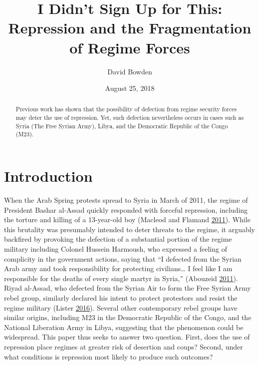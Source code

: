 \documentclass[12pt,]{article}
\title{I Didn't Sign Up for This: Repression and the Fragmentation of Regime
Forces}
\author{David Bowden}
\date{August 25, 2018}
\theoremstyle{definition}
\theoremstyle{definition}
\theoremstyle{definition}
\theoremstyle{remark}
\begin{document}
\maketitle
\begin{abstract}
Previous work has shown that the possibility of defection from regime
security forces may deter the use of repression. Yet, such defection
nevertheless occurs in cases such as Syria (The Free Syrian Army),
Libya, and the Democratic Republic of the Congo (M23).
\end{abstract}

\doublespacing

\setlength{\parindent}{1cm}

\hypertarget{introduction}{%
\section{Introduction}\label{introduction}}

When the Arab Spring protests spread to Syria in March of 2011, the
regime of President Bashar al-Assad quickly responded with forceful
repression, including the torture and killing of a 13-year-old boy
(Macleod and Flamand \protect\hyperlink{ref-Macleod2011}{2011}). While
this brutality was presumably intended to deter threats to the regime,
it arguably backfired by provoking the defection of a substantial
portion of the regime military including Colonel Hussein Harmoush, who
expressed a feeling of complicity in the government actions, saying that
``I defected from the Syrian Arab army and took responsibility for
protecting civilians\ldots{} I feel like I am responsible for the deaths
of every single martyr in Syria,'' (Abouzeid
\protect\hyperlink{ref-Abouzeid2011}{2011}). Riyad al-Assad, who
defected from the Syrian Air to form the Free Syrian Army rebel group,
similarly declared his intent to protect protestors and resist the
regime military (Lister \protect\hyperlink{ref-Lister2016}{2016}).
Several other contemporary rebel groups have similar origins, including
M23 in the Democratic Republic of the Congo, and the National Liberation
Army in Libya, suggesting that the phenomenon could be widespread. This
paper thus seeks to answer two question. First, does the use of
repression place regimes at greater risk of desertion and coups? Second,
under what conditions is repression most likely to produce such
outcomes?
\end{document}

